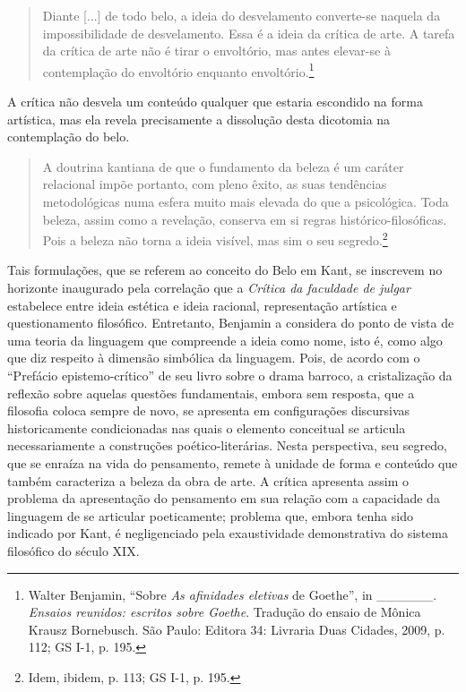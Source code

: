 \begin{quote}
Diante {[}...{]} de todo belo, a ideia do desvelamento converte-se
naquela da impossibilidade de desvelamento. Essa é a ideia da crítica de
arte. A tarefa da crítica de arte não é tirar o envoltório, mas antes
elevar-se à contemplação do envoltório enquanto envoltório.\footnote{Walter
  Benjamin, ``Sobre \emph{As afinidades eletivas} de Goethe'', in
  \_\_\_\_\_\_. \emph{Ensaios reunidos: escritos sobre Goethe}. Tradução
  do ensaio de Mônica Krausz Bornebusch. São Paulo: Editora 34: Livraria
  Duas Cidades, 2009, p. 112; GS I-1, p. 195.}
\end{quote}

A crítica não desvela um conteúdo qualquer que estaria escondido na
forma artística, mas ela revela precisamente a dissolução desta
dicotomia na contemplação do belo.

\begin{quote}
A doutrina kantiana de que o fundamento da beleza é um caráter
relacional impõe portanto, com pleno êxito, as suas tendências
metodológicas numa esfera muito mais elevada do que a psicológica. Toda
beleza, assim como a revelação, conserva em si regras
histórico-filosóficas. Pois a beleza não torna a ideia visível, mas sim
o seu segredo.\footnote{Idem, ibidem, p. 113; GS I-1, p. 195.}
\end{quote}

Tais formulações, que se referem ao conceito do Belo em Kant, se
inscrevem no horizonte inaugurado pela correlação que a \emph{Crítica da
faculdade de julgar} estabelece entre ideia estética e ideia racional,
representação artística e questionamento filosófico. Entretanto,
Benjamin a considera do ponto de vista de uma teoria da linguagem que
compreende a ideia como nome, isto é, como algo que diz respeito à
dimensão simbólica da linguagem. Pois, de acordo com o ``Prefácio
epistemo-crítico'' de seu livro sobre o drama barroco, a cristalização
da reflexão sobre aquelas questões fundamentais, embora sem resposta,
que a filosofia coloca sempre de novo, se apresenta em configurações
discursivas historicamente condicionadas nas quais o elemento conceitual
se articula necessariamente a construções poético-literárias. Nesta
perspectiva, seu segredo, que se enraíza na vida do pensamento, remete à
unidade de forma e conteúdo que também caracteriza a beleza da obra de
arte. A crítica apresenta assim o problema da apresentação do pensamento
em sua relação com a capacidade da linguagem de se articular
poeticamente; problema que, embora tenha sido indicado por Kant, é
negligenciado pela exaustividade demonstrativa do sistema filosófico do
século XIX.

